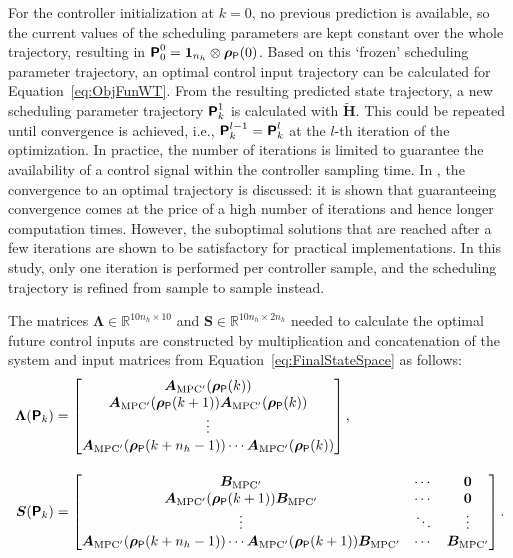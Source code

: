 For the controller initialization at $k = 0$, no previous prediction is available, so the current values of the scheduling parameters are kept constant over the whole trajectory, resulting in $\bm{\mathsf{P}}_0^0 = \bm{1}_{n_h} \otimes \bm{\rho}_{\mathsf{P}}(0)$. Based on this `frozen' scheduling parameter trajectory, an optimal control input trajectory can be calculated for Equation~\eqref{eq:ObjFunWT}. From the resulting predicted state trajectory, a new scheduling parameter trajectory $\bm{\mathsf{P}}_k^{1}$ is calculated with $\tilde{\bm{H}}$. This could be repeated until convergence is achieved, i.e., $\bm{\mathsf{P}}_k^{l-1} = \bm{\mathsf{P}}_k^l$ at the $l$-th iteration of the optimization. In practice, the number of iterations is limited to guarantee the availability of a control signal within the controller sampling time. In \cite{hespe2021convergence}, the convergence to an optimal trajectory is discussed: it is shown that guaranteeing convergence comes at the price of a high number of iterations and hence longer computation times. However, the suboptimal solutions that are reached after a few iterations are shown to be satisfactory for practical implementations. In this study, only one iteration is performed per controller sample, and the scheduling trajectory is refined from sample to sample instead.

The matrices \( \bm{\Lambda} \in \mathbb{R}^{10n_h \times 10}\) and \( \bm{S} \in \mathbb{R}^{10n_h \times 2n_h} \) needed to calculate the optimal future control inputs are constructed by multiplication and concatenation of the system and input matrices from Equation~\eqref{eq:FinalStateSpace} as follows:
\begin{equation} \label{eq:nearlyToeplitzMat}
    \begin{aligned}
        \bm{\Lambda}(\bm{\mathsf{P}}_k) &= \begin{bmatrix}
            \bm{A}_{\text{MPC}^\prime}(\bm{\rho}_{\mathsf{P}}(k)) \\
            \bm{A}_{\text{MPC}^\prime}(\bm{\rho}_{\mathsf{P}}(k+1)) \bm{A}_{\text{MPC}^\prime}(\bm{\rho}_{\mathsf{P}}(k)) \\
            \vdots\\
            \bm{A}_{\text{MPC}^\prime}(\bm{\rho}_{\mathsf{P}}(k+n_h-1)) \cdots \bm{A}_{\text{MPC}^\prime}(\bm{\rho}_{\mathsf{P}}(k))
        \end{bmatrix}, \\[10pt]
        \bm{S}(\bm{\mathsf{P}}_k) &=
        \begin{bmatrix}
            \bm{B}_{\text{MPC}^\prime} & \cdots & \bm{0} \\
            \bm{A}_{\text{MPC}^\prime}(\bm{\rho}_{\mathsf{P}}(k+1)) \bm{B}_{\text{MPC}^\prime} & \cdots & \bm{0} \\
            \vdots & \ddots & \vdots \\
            \bm{A}_{\text{MPC}^\prime}(\bm{\rho}_{\mathsf{P}}(k+n_h-1)) \cdots \bm{A}_{\text{MPC}^\prime}(\bm{\rho}_{\mathsf{P}}(k+1)) \bm{B}_{\text{MPC}^\prime} & \cdots & \bm{B}_{\text{MPC}^\prime}
        \end{bmatrix}.
    \end{aligned}
\end{equation}

